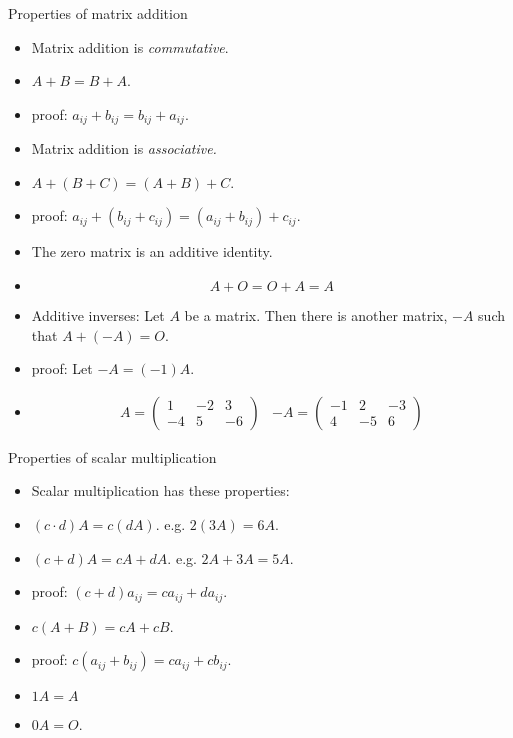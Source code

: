 \documentclass{beamer}
\begin{document}
\begin{frame}{Properties of matrix addition}

\begin{itemize}
\item Matrix addition is \emph{commutative}.
\item $A+B = B + A$.
\item proof: $a_{ij} + b_{ij} = b_{ij} + a_{ij}$.
\item Matrix addition is \emph{associative.}
\item $A + (B + C) = (A + B) + C$.
\item proof: $a_{ij} + (b_{ij} + c_{ij}) = (a_{ij} + b_{ij}) + c_{ij}$.
\item The zero matrix is an additive identity.
\item $$A+O = O + A = A$$
\item Additive inverses: Let $A$ be a matrix. Then there is another
matrix, $-A$ such that $A+(-A) = O$.
\item proof: Let $-A = (-1) A$.
\item
$$
\begin{matrix}

A =

\begin{pmatrix}
1 & -2 & 3\\
-4 & 5  & -6
\end{pmatrix}

&

-A =

\begin{pmatrix}
-1 & 2 & -3\\
4 & -5  & 6
\end{pmatrix}

\end{matrix}
$$
\end{itemize}

\end{frame}


\begin{frame}{Properties of scalar multiplication}

\begin{itemize}
\item Scalar multiplication has these properties:
\item $(c \cdot d) A = c ( d A)$. e.g. $2(3 A) = 6 A$.
\item $(c + d) A = c A + d A$. e.g. $2A + 3A = 5 A$.
\item proof: $(c+d)a_{ij} = c a_{ij} + d a_{ij}$.
\item $c (A + B) = cA + cB$.
\item proof: $c (a_{ij} + b_{ij}) = c a_{ij} + c b_{ij}$.
\item $1 A = A$
\item $0 A = O$.
\end{itemize}

\end{frame}
\end{document}
